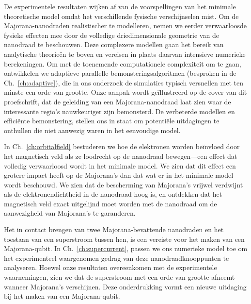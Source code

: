 {
De experimentele resultaten wijken af van de voorspellingen van het minimale theoretische model omdat het verschillende fysische verschijnselen mist.
Om de Majorana-nanodraden realistischer te modelleren, nemen we eerder verwaarloosde fysieke effecten mee door de volledige driedimensionale geometrie van de nanodraad te beschouwen.
Deze complexere modellen gaan het bereik van analytische theorieën te boven en vereisen in plaats daarvan intensieve numerieke berekeningen.
Om met de toenemende computationele complexiteit om te gaan, ontwikkelen we adaptieve parallelle bemonsteringsalgoritmen (besproken in de Ch.~\ref{ch:adaptive}), die in ons onderzoek de simulaties typisch versnellen met ten minste een orde van grootte.
Onze aanpak wordt geïllustreerd op de cover van dit proefschrift, dat de geleiding van een Majorana-nanodraad laat zien waar de interessante regio's nauwkeuriger zijn bemonsterd.
De verbeterde modellen en efficiënte bemonstering, stellen ons in staat om potentiële uitdagingen te onthullen die niet aanwezig waren in het eenvoudige model.

In Ch.~\ref{ch:orbitalfield} bestuderen we hoe de elektronen worden beïnvloed door het magnetisch veld als ze loodrecht op de nanodraad bewegen---een effect dat volledig verwaarloosd wordt in het minimale model.
We zien dat dit effect een grotere impact heeft op de Majorana's dan dat wat er in het minimale model wordt beschouwd.
We zien dat de bescherming van Majorana's vrijwel verdwijnt als de elektronendichtheid in de nanodraad hoog is, en ontdekken dat het magnetisch veld exact uitgelijnd moet worden met de nanodraad om de aanwezigheid van Majorana's te garanderen.

Het in contact brengen van twee Majorana-bevattende nanodraden en het toestaan van een superstroom tussen hen, is een vereiste voor het maken van een Majorana-qubit.
In Ch.~\ref{ch:supercurrent}, passen we ons numerieke model toe om het experimenteel waargenomen gedrag van deze nanodraadknooppunten te analyseren.
Hoewel onze resultaten overeenkomen met de experimentele waarnemingen, zien we dat de superstroom met een orde van grootte afneemt wanneer Majorana's verschijnen.
Deze onderdrukking vormt een nieuwe uitdaging bij het maken van een Majorana-qubit.

}

